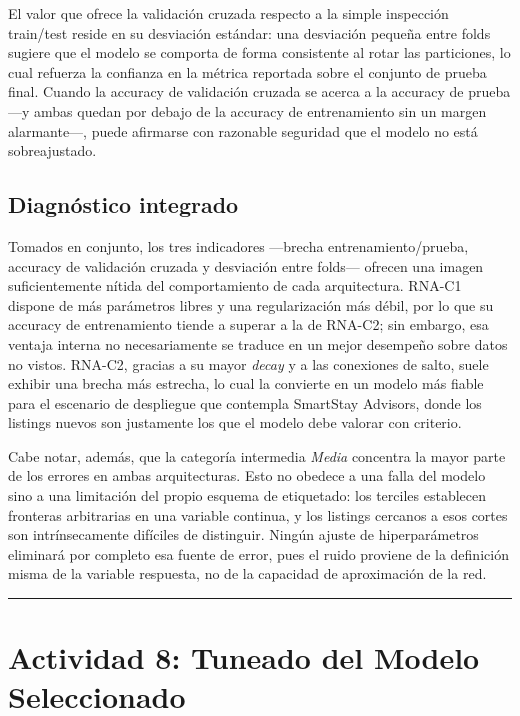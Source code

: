 \documentclass[
]{article}
\begin{document}
El valor que ofrece la validación cruzada respecto a la simple
inspección train/test reside en su desviación estándar: una desviación
pequeña entre folds sugiere que el modelo se comporta de forma
consistente al rotar las particiones, lo cual refuerza la confianza en
la métrica reportada sobre el conjunto de prueba final. Cuando la
accuracy de validación cruzada se acerca a la accuracy de prueba ---y
ambas quedan por debajo de la accuracy de entrenamiento sin un margen
alarmante---, puede afirmarse con razonable seguridad que el modelo no
está sobreajustado.

\subsection{Diagnóstico integrado}\label{diagnuxf3stico-integrado}

Tomados en conjunto, los tres indicadores ---brecha
entrenamiento/prueba, accuracy de validación cruzada y desviación entre
folds--- ofrecen una imagen suficientemente nítida del comportamiento de
cada arquitectura. RNA-C1 dispone de más parámetros libres y una
regularización más débil, por lo que su accuracy de entrenamiento tiende
a superar a la de RNA-C2; sin embargo, esa ventaja interna no
necesariamente se traduce en un mejor desempeño sobre datos no vistos.
RNA-C2, gracias a su mayor \emph{decay} y a las conexiones de salto,
suele exhibir una brecha más estrecha, lo cual la convierte en un modelo
más fiable para el escenario de despliegue que contempla SmartStay
Advisors, donde los listings nuevos son justamente los que el modelo
debe valorar con criterio.

Cabe notar, además, que la categoría intermedia \emph{Media} concentra
la mayor parte de los errores en ambas arquitecturas. Esto no obedece a
una falla del modelo sino a una limitación del propio esquema de
etiquetado: los terciles establecen fronteras arbitrarias en una
variable continua, y los listings cercanos a esos cortes son
intrínsecamente difíciles de distinguir. Ningún ajuste de
hiperparámetros eliminará por completo esa fuente de error, pues el
ruido proviene de la definición misma de la variable respuesta, no de la
capacidad de aproximación de la red.

\begin{center}\rule{0.5\linewidth}{0.5pt}\end{center}

\section{Actividad 8: Tuneado del Modelo
Seleccionado}\label{actividad-8-tuneado-del-modelo-seleccionado}
\end{document}
